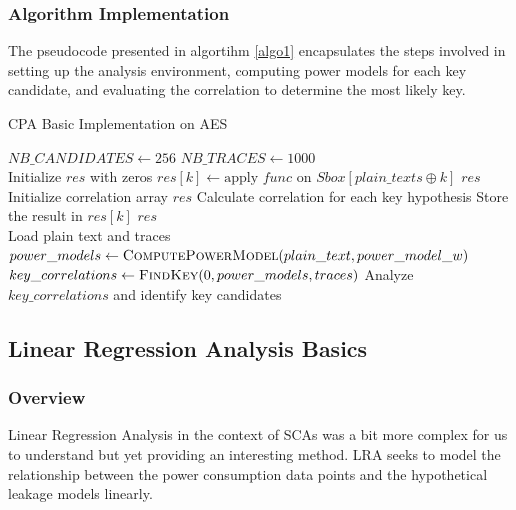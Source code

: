 \documentclass[a4paper,10pt]{article}
\begin{document}
\subsubsection{Algorithm Implementation}
The pseudocode presented in algortihm \ref{algo1} encapsulates the steps involved in setting up the analysis environment, computing power models for each key candidate, and evaluating the correlation to determine the most likely key.

\begin{algorithm}
    \caption{CPA Basic Implementation on AES}
    \label{algo1}
    \begin{algorithmic}
    \State $NB\_CANDIDATES \gets 256$
    \State $NB\_TRACES \gets 1000$ \\
        \State Initialize $res$ with zeros
            \State $res[k] \gets \text{apply } func \text{ on } Sbox[plain\_texts \oplus k]$
        \EndFor
        \State \Return $res$
    \EndFunction \\
        \State Initialize correlation array $res$
            \State Calculate correlation for each key hypothesis
            \State Store the result in $res[k]$
        \EndFor
        \State \Return $res$
    \EndFunction\\
    \State Load plain text and traces
    \State $power\_models \gets \Call{ComputePowerModel}{plain\_text, power\_model\_w}$
    \State $key\_correlations \gets \Call{FindKey}{0, power\_models, traces}$
    \State Analyze $key\_correlations$ and identify key candidates
    \end{algorithmic}
\end{algorithm}

\newpage 

\subsection{Linear Regression Analysis Basics}
\subsubsection{Overview}

Linear Regression Analysis in the context of SCAs was a bit more complex for us to understand but yet providing an interesting method. LRA seeks to model the relationship between the power consumption data points and the hypothetical leakage models linearly.
\end{document}
